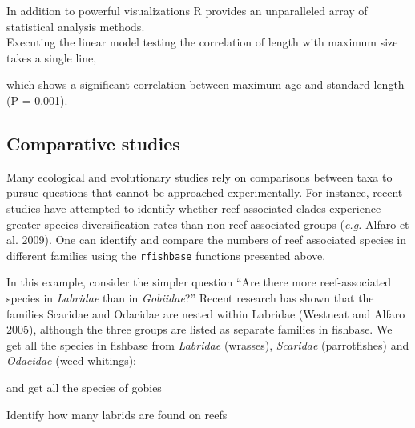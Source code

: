 In addition to powerful visualizations R provides an unparalleled array
of statistical analysis methods.\\Executing the linear model testing the
correlation of length with maximum size takes a single line,

\begin{Shaded}
\begin{Highlighting}[]
\NormalTok{(}\NormalTok{(}
\end{Highlighting}
\end{Shaded}
which shows a significant correlation between maximum age and standard
length (P = 0.001).

\subsection{Comparative studies}

Many ecological and evolutionary studies rely on comparisons between
taxa to pursue questions that cannot be approached experimentally. For
instance, recent studies have attempted to identify whether
reef-associated clades experience greater species diversification rates
than non-reef-associated groups (\emph{e.g.} Alfaro et al. 2009). One
can identify and compare the numbers of reef associated species in
different families using the \texttt{rfishbase} functions presented
above.

In this example, consider the simpler question ``Are there more
reef-associated species in \emph{Labridae} than in \emph{Gobiidae}?''
Recent research has shown that the families Scaridae and Odacidae are
nested within Labridae (Westneat and Alfaro 2005), although the three
groups are listed as separate families in fishbase. We get all the
species in fishbase from \emph{Labridae} (wrasses), \emph{Scaridae}
(parrotfishes) and \emph{Odacidae} (weed-whitings):

\begin{Shaded}
\begin{Highlighting}[]
\NormalTok{(}\NormalTok{, }
\end{Highlighting}
\end{Shaded}
and get all the species of gobies

\begin{Shaded}
\begin{Highlighting}[]
\NormalTok{(}\NormalTok{, }
\end{Highlighting}
\end{Shaded}
Identify how many labrids are found on reefs

